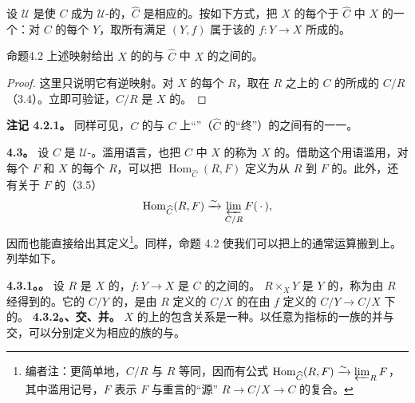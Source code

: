 设 $\mathcal U$ 是使 $C$ 成为 $\mathcal U$-的，$\widehat C$ 是相应的。按如下方式，把 $X$ 的每个于 $\widehat C$ 中 $X$ 的一个：对 $C$ 的每个 $Y$，取所有满足 $(Y,f)$ 属于该的 $f:Y\to X$ 所成的。
\begin{SGAresult}{命题}{4.2}
上述映射给出 $X$ 的的与 $\widehat C$ 中 $X$ 的之间的。
\end{SGAresult}
\begin{proof}
这里只说明它有逆映射。对 $X$ 的每个 $R$，取在 $R$ 之上的 $C$ 的所成的 $C/R$（3.4）。立即可验证，$C/R$ 是 $X$ 的。
\end{proof}
\textbf{注记 4.2.1。} 同样可见，$C$ 的与 $C$ 上“”（$\widehat C$ 的“终”）的之间有的一一。

\textbf{4.3。} 设 $C$ 是 $\mathcal U$-。滥用语言，也把 $\widehat C$ 中 $X$ 的称为 $X$ 的。借助这个用语滥用，对每个 $F$ 和 $X$ 的每个 $R$，可以把 $\operatorname{Hom}_{\widehat C}(R,F)$ 定义为从 $R$ 到 $F$ 的。此外，还有关于 $F$ 的（3.5）
\[\operatorname{Hom}_{\widehat C}(R,F)\xrightarrow{\sim}\varprojlim_{C/R}F(\,\cdot\,),\]
因而也能直接给出其定义\footnote[3]{编者注：更简单地，$C/R$ 与 $R$ 等同，因而有公式 $\operatorname{Hom}_{\widehat C}(R,F)\xrightarrow{\sim}\varprojlim_R F$，其中滥用记号，$F$ 表示 $F$ 与重言的“源” $R\to C/X\to C$ 的复合。}。同样，命题 4.2 使我们可以把上的通常运算搬到上。列举如下。

\textbf{4.3.1。。} 设 $R$ 是 $X$ 的，$f:Y\to X$ 是 $C$ 的之间的。 $R\times_XY$ 是 $Y$ 的，称为由 $R$ 经得到的。它的 $C/Y$ 的，是由 $R$ 定义的 $C/X$ 的在由 $f$ 定义的 $C/Y\to C/X$ 下的。
\textbf{4.3.2。、交、并。} $X$ 的上的包含关系是一种。以任意为指标的一族的并与交，可以分别定义为相应的族的与。

